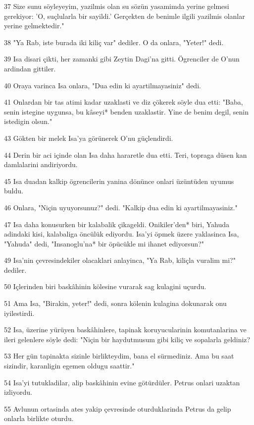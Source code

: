 \par 37 Size sunu söyleyeyim, yazilmis olan su sözün yasamimda yerine gelmesi gerekiyor: 'O, suçlularla bir sayildi.' Gerçekten de benimle ilgili yazilmis olanlar yerine gelmektedir."
\par 38 "Ya Rab, iste burada iki kiliç var" dediler. O da onlara, "Yeter!" dedi.
\par 39 Isa disari çikti, her zamanki gibi Zeytin Dagi'na gitti. Ögrenciler de O'nun ardindan gittiler.
\par 40 Oraya varinca Isa onlara, "Dua edin ki ayartilmayasiniz" dedi.
\par 41 Onlardan bir tas atimi kadar uzaklasti ve diz çökerek söyle dua etti: "Baba, senin istegine uygunsa, bu kâseyi* benden uzaklastir. Yine de benim degil, senin istedigin olsun."
\par 43 Gökten bir melek Isa'ya görünerek O'nu güçlendirdi.
\par 44 Derin bir aci içinde olan Isa daha hararetle dua etti. Teri, topraga düsen kan damlalarini andiriyordu.
\par 45 Isa duadan kalkip ögrencilerin yanina dönünce onlari üzüntüden uyumus buldu.
\par 46 Onlara, "Niçin uyuyorsunuz?" dedi. "Kalkip dua edin ki ayartilmayasiniz."
\par 47 Isa daha konusurken bir kalabalik çikageldi. Onikiler'den* biri, Yahuda adindaki kisi, kalabaliga öncülük ediyordu. Isa'yi öpmek üzere yaklasinca Isa, "Yahuda" dedi, "Insanoglu'na* bir öpücükle mi ihanet ediyorsun?"
\par 49 Isa'nin çevresindekiler olacaklari anlayinca, "Ya Rab, kiliçla vuralim mi?" dediler.
\par 50 Içlerinden biri baskâhinin kölesine vurarak sag kulagini uçurdu.
\par 51 Ama Isa, "Birakin, yeter!" dedi, sonra kölenin kulagina dokunarak onu iyilestirdi.
\par 52 Isa, üzerine yürüyen baskâhinlere, tapinak koruyucularinin komutanlarina ve ileri gelenlere söyle dedi: "Niçin bir haydutmusum gibi kiliç ve sopalarla geldiniz?
\par 53 Her gün tapinakta sizinle birlikteydim, bana el sürmediniz. Ama bu saat sizindir, karanligin egemen oldugu saattir."
\par 54 Isa'yi tutukladilar, alip baskâhinin evine götürdüler. Petrus onlari uzaktan izliyordu.
\par 55 Avlunun ortasinda ates yakip çevresinde oturduklarinda Petrus da gelip onlarla birlikte oturdu.
